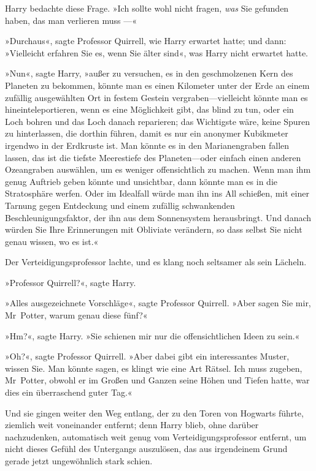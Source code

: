 {Harry bedachte diese Frage. »Ich sollte wohl nicht fragen, \emph{was} Sie gefunden haben, das man verlieren muss —«

»Durchaus«, sagte Professor Quirrell, wie Harry erwartet hatte; und dann: »Vielleicht erfahren Sie es, wenn Sie älter sind«, was Harry nicht erwartet hatte.

»Nun«, sagte Harry, »außer zu versuchen, es in den geschmolzenen Kern des Planeten zu bekommen, könnte man es einen Kilometer unter der Erde an einem zufällig ausgewählten Ort in festem Gestein vergraben—vielleicht könnte man es hineinteleportieren, wenn es eine Möglichkeit gibt, das blind zu tun, oder ein Loch bohren und das Loch danach reparieren; das Wichtigste wäre, keine Spuren zu hinterlassen, die dorthin führen, damit es nur ein anonymer Kubikmeter irgendwo in der Erdkruste ist. Man könnte es in den Marianengraben fallen lassen, das ist die tiefste Meerestiefe des Planeten—oder einfach einen anderen Ozeangraben auswählen, um es weniger offensichtlich zu machen. Wenn man ihm genug Auftrieb geben könnte und unsichtbar, dann könnte man es in die Stratosphäre werfen. Oder im Idealfall würde man ihn ins All schießen, mit einer Tarnung gegen Entdeckung und einem zufällig schwankenden Beschleunigungsfaktor, der ihn aus dem Sonnensystem herausbringt. Und danach würden Sie Ihre Erinnerungen mit Obliviate verändern, so dass selbst Sie nicht genau wissen, wo es ist.«

Der Verteidigungsprofessor lachte, und es klang noch seltsamer als sein Lächeln.

»Professor Quirrell?«, sagte Harry.

»Alles ausgezeichnete Vorschläge«, sagte Professor Quirrell. »Aber sagen Sie mir, Mr~Potter, warum genau diese fünf?«

»Hm?«, sagte Harry. »Sie schienen mir nur die offensichtlichen Ideen zu sein.«

»Oh?«, sagte Professor Quirrell. »Aber dabei gibt ein interessantes Muster, wissen Sie. Man könnte sagen, es klingt wie eine Art Rätsel. Ich muss zugeben, Mr~Potter, obwohl er im Großen und Ganzen seine Höhen und Tiefen hatte, war dies ein überraschend guter Tag.«

Und sie gingen weiter den Weg entlang, der zu den Toren von Hogwarts führte, ziemlich weit voneinander entfernt; denn Harry blieb, ohne darüber nachzudenken, automatisch weit genug vom Verteidigungsprofessor entfernt, um nicht dieses Gefühl des Untergangs auszulösen, das aus irgendeinem Grund gerade jetzt ungewöhnlich stark schien.

}

